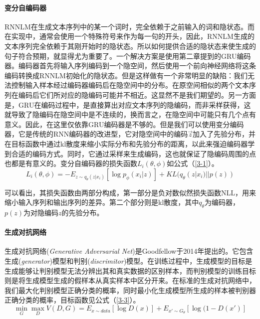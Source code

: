 \paragraph{变分自编码器}
RNNLM在生成文本序列中的某一个词时，完全依赖于之前输入的词和隐状态。而在实现中，通常会使用一个特殊符号来作为每一句的开头，因此，RNNLM生成的文本序列完全依赖于其刚开始时的隐状态。所以如何提供合适的隐状态来使生成的句子符合预期，就显得尤为重要了。一个解决方案是使用第二章提到的GRU编码器。编码器首先将输入序列编码到一个隐空间，然后使用一个前向神经网络将这条编码转换成RNNLM初始化的隐状态。但是这样做有一个非常明显的缺陷：我们无法控制输入样本经过编码器编码后在隐空间中的分布。在原空间相似的两个文本序列在编码后它们所对应的隐编码可能并不相近。这显然不是我们期望的。另一方面是，GRU在编码过程中，是直接算出对应文本序列的隐编码，而非采样获得，这就导致了隐编码在隐空间中是不连续的，换而言之，在隐空间中可能只有几个点有意义。因此，在这里仅依靠GRU编码器是不够的。但是我们可以使用变分编码器，它是传统的RNN编码器的改进型，它对隐空间中的编码\(\overrightarrow{z}\)加入了先验分布，并在目标函数中通过kl散度来缩小实际分布和先验分布的距离，以此来强迫编码器学到合适的编码方式。同时，它通过采样来生成编码，这也就保证了隐编码周围的点也都是有意义的。变分自编码器的损失函数$L_i(\theta,\phi)$如公式（\ref{3-1}）。
\begin{equation}\label{3-1}
    L_i(\theta,\phi)=-E_{z\sim q_\theta(z|x_i)}[\log p_\phi(x_i|z)]+KL (q_\theta(z|x_i)||p(z))
\end{equation}

可以看出，其损失函数由两部分构成，第一部分是负对数似然损失函数NLL，用来缩小输入序列和输出序列的差异。第二个部分则是kl散度，其中$q_\theta$为编码器，$p(z)$为对隐编码$z$的先验分布。
\paragraph{生成对抗网络}
生成对抗网络(\textit{Generative Adversarial Net}\cite{goodfellow_generative_2014})是Goodfellow于2014年提出的。它包含生成(\textit{generator})模型和判别(\textit{discrimitor})模型。在训练过程中，生成模型的目标是生成能够让判别模型无法分辨出其和真实数据的区别样本，而判别模型的训练目标则是将生成模型生成的假样本从真实样本中区分开来。在标准的生成对抗网络中，我们最大化判别模型正确分类的概率，同时最小化生成模型所生成的样本被判别器正确分类的概率，目标函数见公式（\ref{3-3}）。
\begin{equation}\label{3-3}
    \mathop{min}_G \mathop{max}_D V(D,G)=E_{x\sim data}[\log D(x)]+E_{x'\sim G_\theta}[\log(1-D(x')]
\end{equation}

